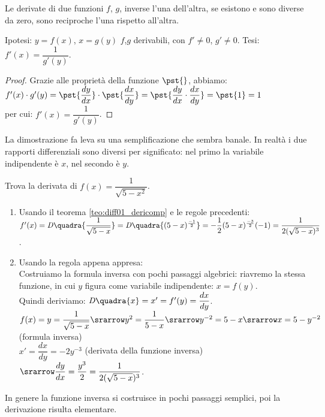 \begin{teorema}
 Le derivate di due funzioni $f$, $g$, inverse l'una dell'altra, se esistono
 e sono diverse da zero, sono reciproche l'una rispetto all'altra.
\end{teorema}
\noindent Ipotesi: $y=f(x)$, $x=g(y)$ $f$,$g$ derivabili, con $f'\ne0$, 
$g'\ne 0$.
\hspace{2cm} Tesi: $f'(x)=\dfrac{1}{g'(y)}$.
\begin{proof}
  Grazie alle proprietà della funzione $\pst{}$, abbiamo:\\
  $f'(x)\cdot g'(y)=\pst{\dfrac{dy}{dx}}\cdot\pst{\dfrac{dx}{dy}}=
  \pst{\dfrac{dy}{dx}\cdot\dfrac{dx}{dy}}=\pst{1}=1$\\
  per cui: $f'(x)=\dfrac{1}{g'(y)}$.
\end{proof}
\begin{osservazione}
 La dimostrazione fa leva su una semplificazione che sembra banale. In 
realtà
 i due rapporti differenziali sono diversi per significato: nel primo la 
 variabile indipendente è $x$, nel secondo è $y$.
\end{osservazione}
\begin{esempio}
  Trova la derivata di $f(x)=\dfrac{1}{\sqrt{5-x^2}}$.
  \begin{enumerate}[noitemsep]
   \item Usando il teorema \ref{teo:diff01_dericomp} e le regole 
precedenti:\\
   $f'(x)=\mathit{D}\quadra{\dfrac{1}{\sqrt{5-x}}}=
   \mathit{D}\quadra{(5-x)^\frac{-1}{2}}=-\dfrac{1}{2}(5-x)
   ^\frac{-3}{2}(-1) = \dfrac{1}{2(\sqrt{5-x})^3}$.
   \item Usando la regola appena appresa:\\
   Costruiamo la formula inversa con pochi passaggi algebrici: riavremo la 
   stessa funzione, in cui $y$ figura come variabile indipendente: 
$x=f(y)$.\\
   Quindi deriviamo: $\mathit{D}\quadra{x}=x'=f'(y)=\dfrac{dx}{dy}$.\\
   $f(x)=y=\dfrac{1}{\sqrt{5-x}}\srarrow y^2=\dfrac{1}{5-x}\srarrow 
   y^{-2}=5-x\srarrow x=5-y^{-2}$  (formula inversa)\\
   $x'=\dfrac{dx}{dy}=-2y^{-3}$ (derivata della funzione inversa)
   $\srarrow \dfrac{dy}{dx}=\dfrac{y^3}{2}=
   \dfrac{1}{2(\sqrt{5-x})^3}$.
  \end{enumerate}
In genere la funzione inversa si costruisce in pochi passaggi semplici, poi 
la derivazione risulta elementare.
\end{esempio}



